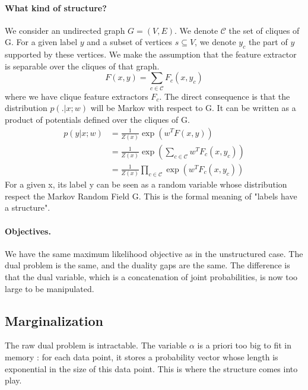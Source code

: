 \documentclass{article}
\DeclareMathOperator{\1}{\mathbb{1}}
\begin{document}
\paragraph{What kind of structure?}
We consider an undirected graph $G=(V,E)$.
We denote $\mathcal{C}$ the set of cliques of G.
For a given label $y$ and a subset of vertices $s \subseteq V$, we denote $y_c$ the part of $y$ supported by these vertices.
We make the assumption that the feature extractor is separable over the cliques of that graph.
\begin{equation}
	F(x, y) =  \sum_{c\in \mathcal{C}} F_c(x, y_c)
\end{equation}
where we have clique feature extractors $F_c$.
The direct consequence is that the distribution $p(. | x ; w)$ will be Markov with respect to G.
It can be written as a product of potentials defined over the cliques of G.
\begin{align*}
	p(y|x ; w)
	& = \frac{1}{Z(x)} \exp(w^TF(x, y)) \\
	& = \frac{1}{Z(x)} \exp( \sum_{c \in \mathcal{C}} w^T F_c(x, y_c))\\
	& = \frac{1}{Z(x)} \prod_{c \in \mathcal{C}} \exp(w^TF_c(x, y_c))
\end{align*}
For a given x, its label y can be seen as a random variable whose distribution respect the Markov Random Field G.
This is the formal meaning of "labels have a structure".


\paragraph{Objectives.}
We have the same maximum likelihood objective as in the unstructured case.
The dual problem is the same, and the duality gaps are the same.
The difference is that the dual variable, which is a concatenation of joint probabilities, is now too large to be manipulated.

\subsection{Marginalization}
The raw dual problem is intractable.
The variable $\alpha$ is a priori too big to fit in memory : for each data point, it stores a probability vector whose length is exponential in the size of this data point.
This is where the structure comes into play.
\end{document}
